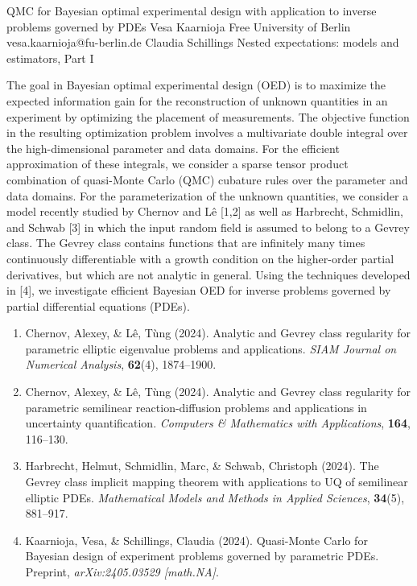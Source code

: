 \begin{talk}
  {QMC for Bayesian optimal experimental design with application to inverse problems governed by PDEs}%
  {Vesa Kaarnioja}%
  {Free University of Berlin}%
  {vesa.kaarnioja@fu-berlin.de}%
  {Claudia Schillings}%
  {Nested expectations: models and estimators, Part I}%
    
   
The goal in Bayesian optimal experimental design (OED) is to maximize the expected information gain for the reconstruction of unknown quantities in an experiment by optimizing the placement of measurements. The objective function in the resulting optimization problem involves a multivariate double integral over the high-dimensional parameter and data domains. For the efficient approximation of these integrals, we consider a sparse tensor product combination of quasi-Monte Carlo (QMC) cubature rules over the parameter and data domains. For the parameterization of the unknown quantities, we consider a model recently studied by Chernov and L\^{e} [1,2] as well as Harbrecht, Schmidlin, and Schwab [3] in which the input random field is assumed to belong to a Gevrey class. The Gevrey class contains functions that are infinitely many times continuously differentiable with a growth condition on the higher-order partial derivatives, but which are not analytic in general. Using the techniques developed in [4], we investigate efficient Bayesian OED for inverse problems governed by partial differential equations (PDEs).
\begin{enumerate}
 \item[{[1]}] Chernov, Alexey, \& L\^{e}, T\`{u}ng (2024). Analytic and Gevrey class regularity for parametric elliptic eigenvalue problems and applications. \emph{SIAM Journal on Numerical Analysis}, \textbf{62}(4), 1874--1900.
 \item[{[2]}] Chernov, Alexey, \& L\^{e}, T\`{u}ng (2024). Analytic and Gevrey class regularity for parametric semilinear reaction-diffusion problems and applications in uncertainty quantification. \emph{Computers \& Mathematics with Applications}, \textbf{164}, 116--130.
 \item[{[3]}] Harbrecht, Helmut, Schmidlin, Marc, \& Schwab, Christoph (2024). The Gevrey class implicit mapping theorem with applications to UQ of semilinear elliptic PDEs. \emph{Mathematical Models and Methods in Applied Sciences}, \textbf{34}(5), 881--917.
 \item[{[4]}] Kaarnioja, Vesa, \& Schillings, Claudia (2024). Quasi-Monte Carlo for Bayesian design of experiment problems governed by parametric PDEs. Preprint, \emph{arXiv:2405.03529 [math.NA]}.
\end{enumerate}

\end{talk}
